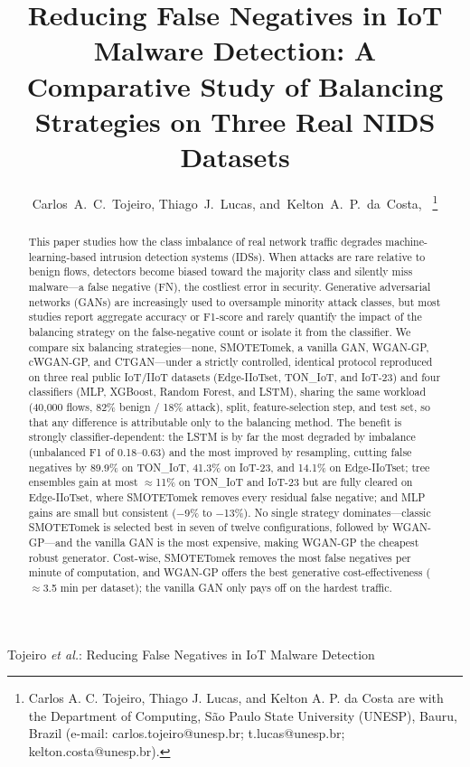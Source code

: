 ﻿\documentclass[journal]{IEEEtran}
\begin{document}
\title{Reducing False Negatives in IoT Malware Detection: A Comparative Study of Balancing Strategies on Three Real NIDS Datasets}

\author{Carlos~A.~C.~Tojeiro,
        Thiago~J.~Lucas,
        and~Kelton~A.~P.~da~Costa,~%
\thanks{Carlos A. C. Tojeiro, Thiago J. Lucas, and Kelton A. P. da Costa are with the Department of Computing, S\~ao Paulo State University (UNESP), Bauru, Brazil (e-mail: carlos.tojeiro@unesp.br; t.lucas@unesp.br; kelton.costa@unesp.br).}}

%
{Tojeiro \MakeLowercase{\textit{et al.}}: Reducing False Negatives in IoT Malware Detection}

\maketitle

\begin{abstract}
This paper studies how the class imbalance of real network traffic degrades machine-learning-based intrusion detection systems (IDSs). When attacks are rare relative to benign flows, detectors become biased toward the majority class and silently miss malware---a false negative (FN), the costliest error in security. Generative adversarial networks (GANs) are increasingly used to oversample minority attack classes, but most studies report aggregate accuracy or F1-score and rarely quantify the impact of the balancing strategy on the false-negative count or isolate it from the classifier. We compare six balancing strategies---none, SMOTETomek, a vanilla GAN, WGAN-GP, cWGAN-GP, and CTGAN---under a strictly controlled, identical protocol reproduced on three real public IoT/IIoT datasets (Edge-IIoTset, TON\_IoT, and IoT-23) and four classifiers (MLP, XGBoost, Random Forest, and LSTM), sharing the same workload (40{,}000 flows, 82\% benign / 18\% attack), split, feature-selection step, and test set, so that any difference is attributable only to the balancing method. The benefit is strongly classifier-dependent: the LSTM is by far the most degraded by imbalance (unbalanced F1 of 0.18--0.63) and the most improved by resampling, cutting false negatives by 89.9\% on TON\_IoT, 41.3\% on IoT-23, and 14.1\% on Edge-IIoTset; tree ensembles gain at most $\approx$11\% on TON\_IoT and IoT-23 but are fully cleared on Edge-IIoTset, where SMOTETomek removes every residual false negative; and MLP gains are small but consistent ($-$9\% to $-$13\%). No single strategy dominates---classic SMOTETomek is selected best in seven of twelve configurations, followed by WGAN-GP---and the vanilla GAN is the most expensive, making WGAN-GP the cheapest robust generator. Cost-wise, SMOTETomek removes the most false negatives per minute of computation, and WGAN-GP offers the best generative cost-effectiveness ($\approx$3.5 min per dataset); the vanilla GAN only pays off on the hardest traffic.
\end{abstract}
\end{document}
